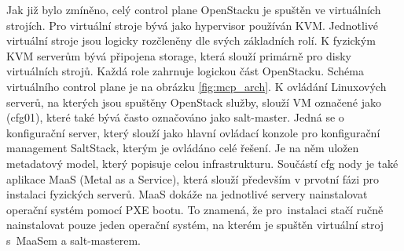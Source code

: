 Jak již bylo zmíněno, celý control plane OpenStacku je spuštěn ve virtuálních strojích. Pro virtuální stroje bývá jako hypervisor používán KVM. Jednotlivé virtuální stroje jsou logicky rozčleněny dle svých základních rolí. K fyzickým KVM serverům bývá připojena storage, která slouží primárně pro disky virtuálních strojů. Každá role zahrnuje logickou část OpenStacku. Schéma virtuálního control plane je na obrázku \ref{fig:mcp_arch}. K ovládání Linuxových serverů, na kterých jsou spuštěny OpenStack služby, slouží VM označené jako (cfg01), které také bývá často označováno jako salt-master. Jedná se o konfigurační server, který slouží jako hlavní ovládací konzole pro konfigurační management SaltStack, kterým je ovládáno celé řešení. Je na něm uložen metadatový model, který popisuje celou infrastrukturu. Součástí cfg nody je také aplikace MaaS (Metal as a Service), která slouží především v prvotní fázi pro instalaci fyzických serverů. MaaS dokáže na jednotlivé servery nainstalovat operační systém pomocí PXE bootu. To znamená, že pro instalaci stačí ručně nainstalovat pouze jeden operační systém, na kterém je spuštěn virtuální stroj s MaaSem a salt-masterem.

